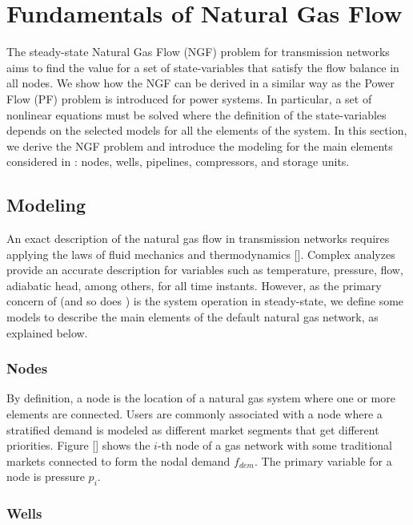 \chapter{Fundamentals of Natural Gas Flow}
\label{chap:fund_NGF}

The steady-state Natural Gas Flow (NGF) problem for transmission networks aims to find the value for a set of state-variables that satisfy the flow balance in all nodes. We show how the NGF can be derived in a similar way as the Power Flow (PF) problem is introduced for power systems. In  particular, a set of nonlinear equations must be solved where the definition of the state-variables depends on the selected models for all the elements of the system. In this section, we derive the NGF problem and introduce the modeling for the main elements considered in \mpng{}: nodes, wells, pipelines, compressors, and storage units.

\section{Modeling}
\label{sec:gas_modeling}

An exact description of the natural gas flow in transmission networks requires applying the laws of fluid mechanics and thermodynamics []. Complex analyzes provide an accurate description for variables such as temperature, pressure, flow, adiabatic head, among others, for all time instants. However, as the primary concern of \matpower{} (and so does \mpng{}) is the system operation in steady-state, we define some models to describe the main elements of the default natural gas network, as explained below. 

\subsection{Nodes}
\label{subsec:nodes}

By definition, a node is the location of a natural gas system where one or more elements are connected. Users are commonly associated with a node where a stratified demand is modeled as different market segments that get different priorities. Figure [] shows the $i$-th node of a gas network with some traditional markets connected to form the nodal demand $f_{dem}$. The primary variable for a node is pressure $p_i$.


\subsection{Wells}
\label{subsec:wells}

